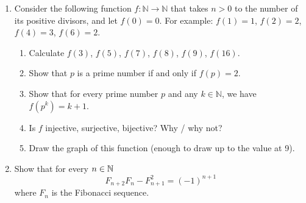 \documentclass[12pt]{amsart}
\begin{document}
\begin{enumerate}[label=\arabic*.,itemsep=10pt, leftmargin=*]
\item  Consider the following function 
$f : \mathbb{N} \to \mathbb{N}$ that takes $n>0$ to the number of its positive divisors, and let $f(0) = 0$. For example:
$f(1) = 1$,
$f(2) = 2$,
$f(4) = 3$,
$f(6) = 2$.
    \begin{enumerate}[label=\alph*.,itemsep=5pt, leftmargin=*]
    \item Calculate $f(3)$, $f(5)$, $f(7)$, $f(8)$, $f(9)$, $f(16)$.
    \item Show that $p$ is a prime number if and only if $f(p)=2$.
    \item Show that for every prime number $p$ and any $k\in \mathbb{N}$, we have $f(p^k) = k+1$.
    \item Is $f$ injective, surjective, bijective? Why / why not?
    \item Draw the graph of this function (enough to draw up to the value at 9).
    \end{enumerate}

\item Show that for every $n\in \mathbb{N}$
\begin{equation*}
    F_{n+2} F_n - F_{n+1}^2 = (-1)^{n+1}    
\end{equation*}
where $F_n$ is the Fibonacci sequence.


\end{enumerate}
\end{document}
